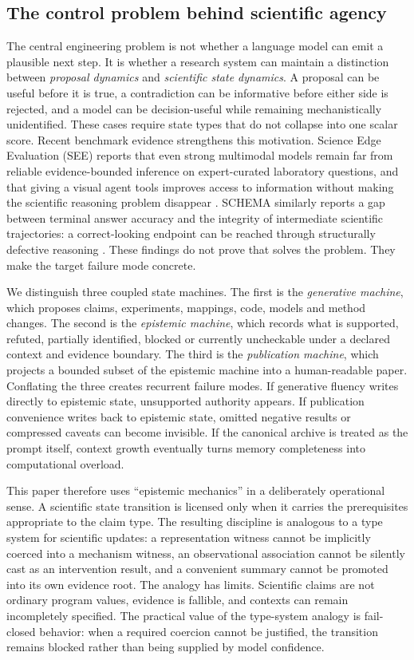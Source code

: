 \subsection{The control problem behind scientific agency}

The central engineering problem is not whether a language model can emit a plausible next step. It is whether a research system can maintain a distinction between \emph{proposal dynamics} and \emph{scientific state dynamics}. A proposal can be useful before it is true, a contradiction can be informative before either side is rejected, and a model can be decision-useful while remaining mechanistically unidentified. These cases require state types that do not collapse into one scalar score. Recent benchmark evidence strengthens this motivation. Science Edge Evaluation (SEE) reports that even strong multimodal models remain far from reliable evidence-bounded inference on expert-curated laboratory questions, and that giving a visual agent tools improves access to information without making the scientific reasoning problem disappear \cite{han2026see}. SCHEMA similarly reports a gap between terminal answer accuracy and the integrity of intermediate scientific trajectories: a correct-looking endpoint can be reached through structurally defective reasoning \cite{feng2026schema}. These findings do not prove that \RAKL{} solves the problem. They make the target failure mode concrete.

We distinguish three coupled state machines. The first is the \emph{generative machine}, which proposes claims, experiments, mappings, code, models and method changes. The second is the \emph{epistemic machine}, which records what is supported, refuted, partially identified, blocked or currently uncheckable under a declared context and evidence boundary. The third is the \emph{publication machine}, which projects a bounded subset of the epistemic machine into a human-readable paper. Conflating the three creates recurrent failure modes. If generative fluency writes directly to epistemic state, unsupported authority appears. If publication convenience writes back to epistemic state, omitted negative results or compressed caveats can become invisible. If the canonical archive is treated as the prompt itself, context growth eventually turns memory completeness into computational overload.

This paper therefore uses ``epistemic mechanics'' in a deliberately operational sense. A scientific state transition is licensed only when it carries the prerequisites appropriate to the claim type. The resulting discipline is analogous to a type system for scientific updates: a representation witness cannot be implicitly coerced into a mechanism witness, an observational association cannot be silently cast as an intervention result, and a convenient summary cannot be promoted into its own evidence root. The analogy has limits. Scientific claims are not ordinary program values, evidence is fallible, and contexts can remain incompletely specified. The practical value of the type-system analogy is fail-closed behavior: when a required coercion cannot be justified, the transition remains blocked rather than being supplied by model confidence.

